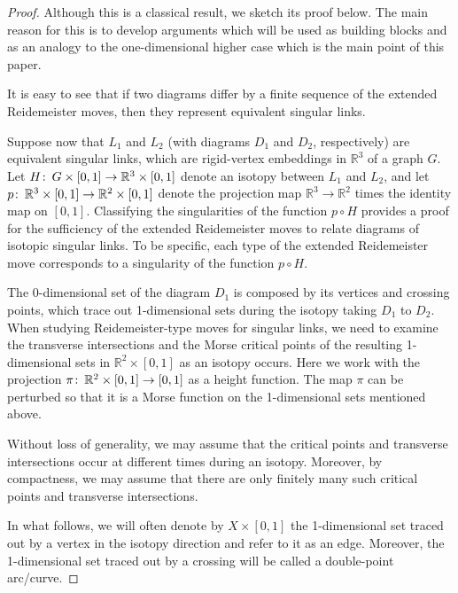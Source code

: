 \documentclass{amsart}\usepackage{amsfonts, amsmath, amssymb}\usepackage{graphicx, epic, epsf, enumerate, stmaryrd}
\theoremstyle{definition}
\numberwithin{equation}{section}
\begin{document}
\begin{proof}
Although this is a classical result, we sketch its proof below. The main reason for this is to develop arguments which will be used as building blocks and as an analogy to the one-dimensional higher case which is the main point of this paper.

It is easy to see that if two diagrams differ by a finite sequence of the extended Reidemeister moves, then they represent equivalent singular links.

Suppose now that $L_1$ and $L_2$ (with diagrams $D_1$ and $D_2$, respectively) are equivalent singular links, which are rigid-vertex embeddings in ${\mathbb{R}}^3$ of a graph $G$.
Let $H {\colon\thinspace} G \times [0, 1] \to {\mathbb{R}}^3 \times [0, 1]$ denote an isotopy between $L_1$ and $L_2$, and let $p {\colon\thinspace} {\mathbb{R}}^3 \times [0, 1] \to {\mathbb{R}}^2 \times [0, 1]$ denote the projection map ${\mathbb{R}}^3 \to {\mathbb{R}}^2$ times the identity map on $[0, 1]$. Classifying the singularities of the function $p \circ H$ provides a proof for the sufficiency of the extended Reidemeister moves to relate diagrams of isotopic singular links. To be specific, each type of the extended Reidemeister move corresponds to a singularity of the function $p \circ H$.

The $0$-dimensional set of the diagram $D_1$ is composed by its vertices and crossing points, which trace out 1-dimensional sets during the isotopy taking $D_1$ to $D_2$. When studying Reidemeister-type moves for singular links, we need to examine the transverse intersections and the Morse critical points of the resulting 1-dimensional sets in $\mathbb{R}^2 \times [0,1]$ as an isotopy occurs. Here we work with the projection $\pi {\colon\thinspace} {\mathbb{R}}^2 \times [0, 1] \to [0, 1]$ as a height function. The map $\pi$  can be perturbed so that it is a Morse function on the 1-dimensional sets mentioned above. 

Without loss of generality, we may assume that the critical points and transverse intersections occur at different times during an isotopy. Moreover, by compactness, we may assume that there are only finitely many such critical points and transverse intersections.

In what follows, we will often denote by $X \times [0, 1]$ the 1-dimensional set traced out by a vertex in the isotopy direction and refer to it as an edge. Moreover, the 1-dimensional set traced out by a crossing will be called a double-point arc/curve.


\end{proof}
\end{document}
